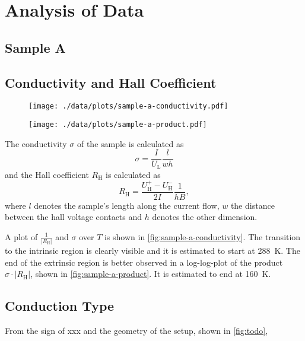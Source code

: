 \chapter{Analysis of Data}

\section{Sample A}

\section{Conductivity and Hall Coefficient}
\begin{figure}
  \centering
  \texttt{[image: ./data/plots/sample-a-conductivity.pdf]}
  \label{fig:sample-a-conductivity}
\end{figure}

\begin{figure}
  \centering
  \texttt{[image: ./data/plots/sample-a-product.pdf]}
  \label{fig:sample-a-product}
\end{figure}

The conductivity $\sigma$ of the sample is calculated as
\begin{equation*}
	\sigma = \frac{I}{U_\text{L}} \frac{l}{w h}
\end{equation*}
and the Hall coefficient $R_\text{H}$ is calculated as
\begin{equation*}
	R_\text{H} = \frac{U_\text{H}^+ - U_\text{H}^-}{2 I} \frac{1}{h B},
\end{equation*}
where $l$ denotes the sample's length along the current flow, $w$ the distance between the hall voltage contacts and $h$ denotes the other dimension.

A plot of $\frac{1}{\left|R_\text{H}\right|}$ and $\sigma$ over $T$ is shown in \autoref{fig:sample-a-conductivity}.
The transition to the intrinsic region is clearly visible and it is estimated to start at \SI{288}{\kelvin}.
The end of the extrinsic region is better observed in a log-log-plot of the product $\sigma \cdot \left| R_\text{H} \right|$, shown in \autoref{fig:sample-a-product}.
It is estimated to end at \SI{160}{\kelvin}.

\section{Conduction Type}
From the sign of xxx and the geometry of the setup, shown in \autoref{fig:todo}, \todo{}

